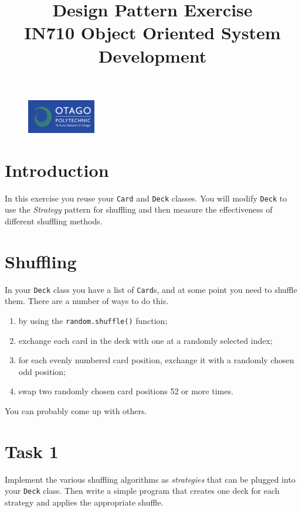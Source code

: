 \documentclass{article}
\begin{document}
\begin{figure}
\includegraphics[width=30mm]{../../../resources/images/oplogo.png}
\end{figure}

\title{Design Pattern Exercise\\IN710 Object Oriented System Development}
\date{}
\maketitle

\section*{Introduction}
In this exercise you reuse your \texttt{Card} and \texttt{Deck} classes.  
You will modify \texttt{Deck} to use the \emph{Strategy} 
pattern for shuffling and then measure the effectiveness of different 
shuffling methods.

\section{Shuffling}
In your \texttt{Deck} class you have a list of \texttt{Card}s, and at some 
point you need to shuffle them.  There are a number of ways to do this.

\begin{enumerate}
	\item by using the \texttt{random.shuffle()} function;
	\item exchange each card in the deck with one at a 
		randomly selected index;
	\item for each evenly numbered card position, exchange
		it with a randomly chosen odd position;
	\item swap two randomly chosen card positions 52 or more times.
\end{enumerate}

You can probably come up with others.

\section{Task 1}
Implement the various shuffling algorithms as \emph{strategies} that can be
plugged into your \texttt{Deck} class.  Then write a simple program that
creates one deck for each strategy and applies the appropriate shuffle.
\end{document}
